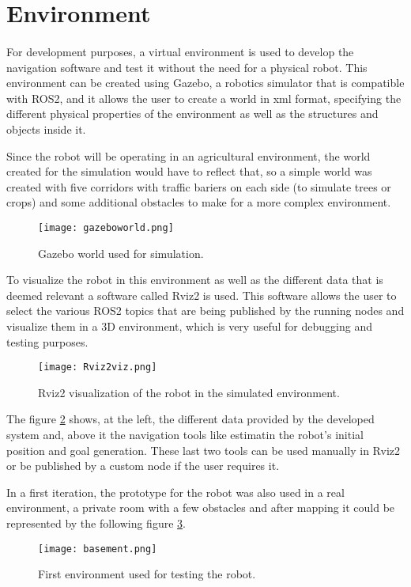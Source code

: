 \section{Environment}
\label{subsec:environment}
\paragraph{}For development purposes, a virtual environment is used to develop the navigation software 
and test it without the need for a physical robot. This environment can be created using Gazebo, a 
robotics simulator that is compatible with \gls{ROS2}, and it allows the user to create a world in xml format, specifying 
the different physical properties of the environment as well as the structures and objects inside it.

Since the robot will be operating in an agricultural environment, the world created for 
the simulation would have to reflect that, so a simple world was created with five 
corridors with traffic bariers on each side (to simulate trees or crops) and some additional 
obstacles to make for a more complex environment.
\begin{figure}[H]
    \centering
    \texttt{[image: gazeboworld.png]}
    \caption{Gazebo world used for simulation.}
    \label{fig:gazebo_world}
\end{figure}


To visualize the robot in this environment as well as the different data that is deemed relevant a software called 
Rviz2 is used. This software allows the user to select the various \gls{ROS2} topics that are being published 
by the running nodes and visualize them in a 3D environment, which is very useful for debugging and testing purposes.
\begin{figure}[H]
    \centering
    \texttt{[image: Rviz2viz.png]}
    \caption{Rviz2 visualization of the robot in the simulated environment. }
    \label{fig:rviz2_visualization}
\end{figure}

The figure \ref{fig:rviz2_visualization} shows, at the left, the different data provided by the developed system and, above it the 
navigation tools like estimatin the robot's initial position and goal generation. These last two tools can be used manually 
in Rviz2 or be published by a custom node if the user requires it.

In a first iteration, the prototype for the robot was also used in a real environment, a private room with a few obstacles 
and after mapping it could be represented by the following figure \ref{fig:basement}.
\begin{figure}[H]
    \centering
    \texttt{[image: basement.png]}
    \caption{First environment used for testing the robot.}
    \label{fig:basement}
\end{figure}

